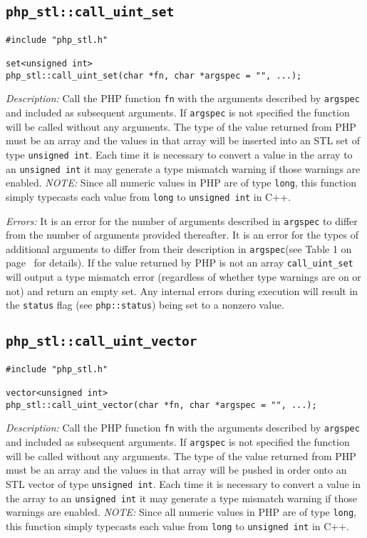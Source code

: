 \documentclass[11pt,titlepage]{article}
\begin{document}
\subsection{\texttt{php\_stl::call\_uint\_set}}

\begin{verbatim}
#include "php_stl.h"

set<unsigned int> 
php_stl::call_uint_set(char *fn, char *argspec = "", ...);
\end{verbatim}

\emph{Description:} Call the PHP function \verb|fn| with the arguments described by \verb|argspec| and included as subsequent arguments. If \verb|argspec| is not specified the function will be called without any arguments. The type of the value returned from PHP must be an array and the values in that array will be inserted into an STL set of type \verb|unsigned int|. Each time it is necessary to convert a value in the array to an \verb|unsigned int| it may generate a type mismatch warning if those warnings are enabled. \emph{NOTE:} Since all numeric values in PHP are of type \verb|long|, this function simply typecasts each value from \verb|long| to \verb|unsigned int| in C++.

\emph{Errors:} It is an error for the number of arguments described in \verb|argspec| to differ from the number of arguments provided thereafter. It is an error for the types of additional arguments to differ from their description in \verb|argspec|(see Table 1 on page~\pageref{Table1} for details). If the value returned by PHP is not an array \verb|call_uint_set| will output a type mismatch error (regardless of whether type warnings are on or not) and return an empty set. Any internal errors during execution will result in the \verb|status| flag (see \verb|php::status|) being set to a nonzero value.


\subsection{\texttt{php\_stl::call\_uint\_vector}}

\begin{verbatim}
#include "php_stl.h"

vector<unsigned int> 
php_stl::call_uint_vector(char *fn, char *argspec = "", ...);
\end{verbatim}

\emph{Description:} Call the PHP function \verb|fn| with the arguments described by \verb|argspec| and included as subsequent arguments. If \verb|argspec| is not specified the function will be called without any arguments. The type of the value returned from PHP must be an array and the values in that array will be pushed in order onto an STL vector of type \verb|unsigned int|. Each time it is necessary to convert a value in the array to an \verb|unsigned int| it may generate a type mismatch warning if those warnings are enabled. \emph{NOTE:} Since all numeric values in PHP are of type \verb|long|, this function simply typecasts each value from \verb|long| to \verb|unsigned int| in C++.
\end{document}
